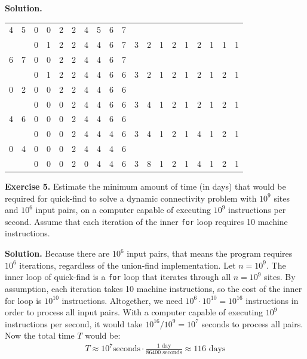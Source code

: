 \documentclass[12pt, a4paper]{article}
\newenvironment{ex}[2][Exercise]
{\par\medskip\noindent \textbf{#1 #2.}}
{\medskip}
\newenvironment{sol}[1][Solution]
{\par\medskip\noindent \textbf{#1.} }
{\medskip}
\begin{document}
\begin{sol}
\begin{center}
\begin{tabular}{cc|cccccccc|c|cccccccc}
				4  & 5  & 0 & 0 & 2 & 2 & {\color{green}4} & {\color{green}5} & 6 & 7 & {}\\
				{} & {} & 0 & 1 & 2 & 2 & 4 & {\color{red}4} & 6 & 7 & 3
				& 2 & 1 & 2 & 1 & 2 & 1 & 1 & 1\\
				
				6 & 7 & 0 & 0 & 2 & 2 & 4 & 4 & {\color{green}6} & {\color{green}7} & {}\\
				{} & {} & 0 & 1 & 2 & 2 & 4 & 4 & 6 & {\color{red}6} & 3
				& 2 & 1 & 2 & 1 & 2 & 1 & 2 & 1\\
				
				0  & 2  & {\color{green}0} & 0 & {\color{green}2} & 2 & 4 & 4 & 6 & 6 & {}\\
				{} & {} & 0 & 0 & {\color{red}0} & 2 & 4 & 4 & 6 & 6 & 3
				& 4 & 1 & 2 & 1 & 2 & 1 & 2 & 1\\
				
				4  & 6  & 0 & 0 & 0 & 2 & {\color{green}4} & 4 & {\color{green}6} & 6 & {}\\
				{} & {} & 0 & 0 & 0 & 2 & 4 & 4 & {\color{red}4} & 6 & 3
				& 4 & 1 & 2 & 1 & 4 & 1 & 2 & 1\\
				
				0  & 4  & {\color{green}0} & 0 & 0 & 2 & {\color{green}4} & 4 & 4 & 6 & {}\\
				{} & {} & 0 & 0 & 0 & 2 & {\color{red}0} & 4 & 4 & 6 & 3
				& 8 & 1 & 2 & 1 & 4 & 1 & 2 & 1\\
			\end{tabular}
		\end{center}
	\end{sol}
	\begin{ex}{5}
		Estimate the minimum amount of time (in days) that would be required for quick-find
		to solve a dynamic connectivity problem with $10^9$ sites and $10^6$ input pairs,
		on a computer capable of executing $10^9$ instructions per second. Assume that each
		iteration of the  inner \texttt{for} loop requires 10 machine instructions.
	\end{ex}
	\begin{sol}
		Because there are $10^6$ input pairs, that means the program requires $10^6$ iterations,
		regardless of the union-find implementation. Let $n=10^9$. The inner loop of quick-find
		is a \texttt{for} loop that iterates through all $n=10^9$ sites. By assumption, each
		iteration takes 10 machine instructions, so the cost of the inner for loop is
		$10^{10}$ instructions. Altogether, we need $10^6\cdot 10^{10}=10^{16}$ instructions
		in order to process all input pairs. With a computer capable of executing $10^9$
		instructions per second, it would take $10^{16}/10^9=10^7$ seconds to process all pairs.
		Now the total time $T$ would be:
		\begin{align*}
			T \approx 10^7\text {seconds} \cdot \frac{1 \text{ day}}{86400 \text{ seconds}} \approx 116 \text{ days}
		\end{align*}
	\end{sol}
\end{document}
